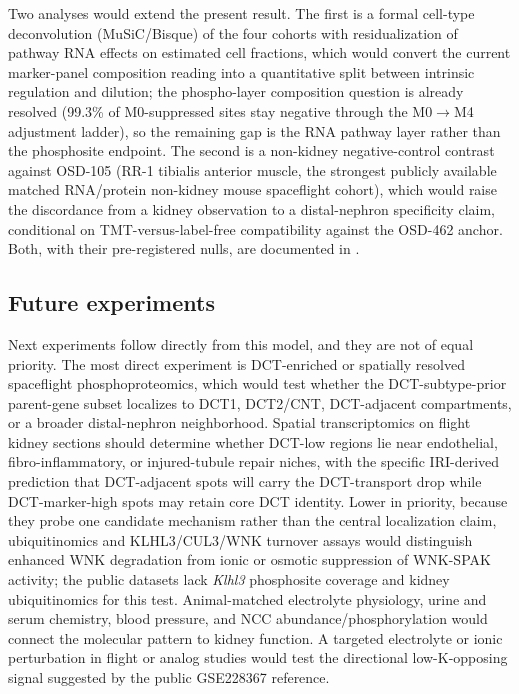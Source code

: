 \documentclass[11pt]{article}
\newcommand{\gene}[1]{\textit{#1}}
\begin{document}
Two analyses would extend the present result. The first is a formal cell-type deconvolution (MuSiC/Bisque) of the four cohorts with residualization of pathway RNA effects on estimated cell fractions, which would convert the current marker-panel composition reading into a quantitative split between intrinsic regulation and dilution; the phospho-layer composition question is already resolved (99.3\% of M0-suppressed sites stay negative through the M0$\to$M4 adjustment ladder), so the remaining gap is the RNA pathway layer rather than the phosphosite endpoint. The second is a non-kidney negative-control contrast against OSD-105 (RR-1 tibialis anterior muscle, the strongest publicly available matched RNA/protein non-kidney mouse spaceflight cohort), which would raise the discordance from a kidney observation to a distal-nephron specificity claim, conditional on TMT-versus-label-free compatibility against the OSD-462 anchor. Both, with their pre-registered nulls, are documented in .

\subsection{Future experiments}

Next experiments follow directly from this model, and they are not of equal priority. The most direct experiment is DCT-enriched or spatially resolved spaceflight phosphoproteomics, which would test whether the DCT-subtype-prior parent-gene subset localizes to DCT1, DCT2/CNT, DCT-adjacent compartments, or a broader distal-nephron neighborhood. Spatial transcriptomics on flight kidney sections should determine whether DCT-low regions lie near endothelial, fibro-inflammatory, or injured-tubule repair niches, with the specific IRI-derived prediction that DCT-adjacent spots will carry the DCT-transport drop while DCT-marker-high spots may retain core DCT identity. Lower in priority, because they probe one candidate mechanism rather than the central localization claim, ubiquitinomics and KLHL3/CUL3/WNK turnover assays would distinguish enhanced WNK degradation from ionic or osmotic suppression of WNK-SPAK activity; the public datasets lack \gene{Klhl3} phosphosite coverage and kidney ubiquitinomics for this test. Animal-matched electrolyte physiology, urine and serum chemistry, blood pressure, and NCC abundance/phosphorylation would connect the molecular pattern to kidney function. A targeted electrolyte or ionic perturbation in flight or analog studies would test the directional low-K-opposing signal suggested by the public GSE228367 reference.
\end{document}
